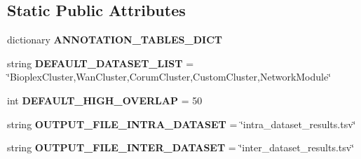 \subsection*{Static Public Attributes}
\begin{DoxyCompactItemize}
\item 
dictionary {\bfseries A\-N\-N\-O\-T\-A\-T\-I\-O\-N\-\_\-\-T\-A\-B\-L\-E\-S\-\_\-\-D\-I\-C\-T}
\item 
\hypertarget{classsrc_1_1fr_1_1tagc_1_1rainet_1_1core_1_1execution_1_1analysis_1_1EnrichmentAnalysis_1_1Comple500f6ec22a9a1e615c8c425ff66b262_aad332efb5616f17a939fa598621f0007}{string {\bfseries D\-E\-F\-A\-U\-L\-T\-\_\-\-D\-A\-T\-A\-S\-E\-T\-\_\-\-L\-I\-S\-T} = \char`\"{}Bioplex\-Cluster,Wan\-Cluster,Corum\-Cluster,Custom\-Cluster,Network\-Module\char`\"{}}\label{classsrc_1_1fr_1_1tagc_1_1rainet_1_1core_1_1execution_1_1analysis_1_1EnrichmentAnalysis_1_1Comple500f6ec22a9a1e615c8c425ff66b262_aad332efb5616f17a939fa598621f0007}

\item 
\hypertarget{classsrc_1_1fr_1_1tagc_1_1rainet_1_1core_1_1execution_1_1analysis_1_1EnrichmentAnalysis_1_1Comple500f6ec22a9a1e615c8c425ff66b262_a8d0c899ca889203c110ee554dc431ed8}{int {\bfseries D\-E\-F\-A\-U\-L\-T\-\_\-\-H\-I\-G\-H\-\_\-\-O\-V\-E\-R\-L\-A\-P} = 50}\label{classsrc_1_1fr_1_1tagc_1_1rainet_1_1core_1_1execution_1_1analysis_1_1EnrichmentAnalysis_1_1Comple500f6ec22a9a1e615c8c425ff66b262_a8d0c899ca889203c110ee554dc431ed8}

\item 
\hypertarget{classsrc_1_1fr_1_1tagc_1_1rainet_1_1core_1_1execution_1_1analysis_1_1EnrichmentAnalysis_1_1Comple500f6ec22a9a1e615c8c425ff66b262_a0cf4a867dc95e57acb1f8607591a7f5f}{string {\bfseries O\-U\-T\-P\-U\-T\-\_\-\-F\-I\-L\-E\-\_\-\-I\-N\-T\-R\-A\-\_\-\-D\-A\-T\-A\-S\-E\-T} = \char`\"{}intra\-\_\-dataset\-\_\-results.\-tsv\char`\"{}}\label{classsrc_1_1fr_1_1tagc_1_1rainet_1_1core_1_1execution_1_1analysis_1_1EnrichmentAnalysis_1_1Comple500f6ec22a9a1e615c8c425ff66b262_a0cf4a867dc95e57acb1f8607591a7f5f}

\item 
\hypertarget{classsrc_1_1fr_1_1tagc_1_1rainet_1_1core_1_1execution_1_1analysis_1_1EnrichmentAnalysis_1_1Comple500f6ec22a9a1e615c8c425ff66b262_a2f2745004b2b166e84a6c1de67de0b12}{string {\bfseries O\-U\-T\-P\-U\-T\-\_\-\-F\-I\-L\-E\-\_\-\-I\-N\-T\-E\-R\-\_\-\-D\-A\-T\-A\-S\-E\-T} = \char`\"{}inter\-\_\-dataset\-\_\-results.\-tsv\char`\"{}}\label{classsrc_1_1fr_1_1tagc_1_1rainet_1_1core_1_1execution_1_1analysis_1_1EnrichmentAnalysis_1_1Comple500f6ec22a9a1e615c8c425ff66b262_a2f2745004b2b166e84a6c1de67de0b12}

\end{DoxyCompactItemize}


